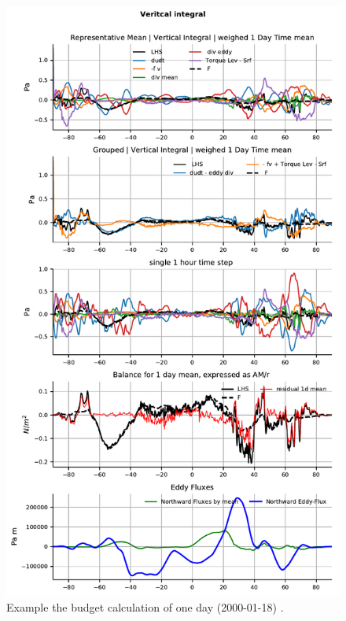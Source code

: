 \documentclass[11pt]{article}
\numberwithin{equation}{section}
\begin{document}
\begin{figure}[h!]
\centerline{\includegraphics[scale=.7]{exmpl_repres_dmean_ps_iews_2000-01-18.pdf}}
\caption{Example the budget calculation of one day (2000-01-18) .}
\label{fig:AM_example1}
\end{figure}
\end{document}
